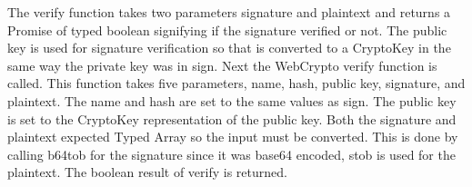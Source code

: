 The verify function takes two parameters signature and plaintext and returns a Promise of typed boolean signifying if the signature verified or not. The public key is used for signature verification so that is converted to a CryptoKey in the same way the private key was in sign. Next the WebCrypto verify function is called. This function takes five parameters, name, hash, public key, signature, and plaintext. The name and hash are set to the same values as sign. The public key is set to the CryptoKey representation of the public key. Both the signature and plaintext expected Typed Array so the input must be converted. This is done by calling b64tob for the signature since it was base64 encoded, stob is used for the plaintext. The boolean result of verify is returned.
 





